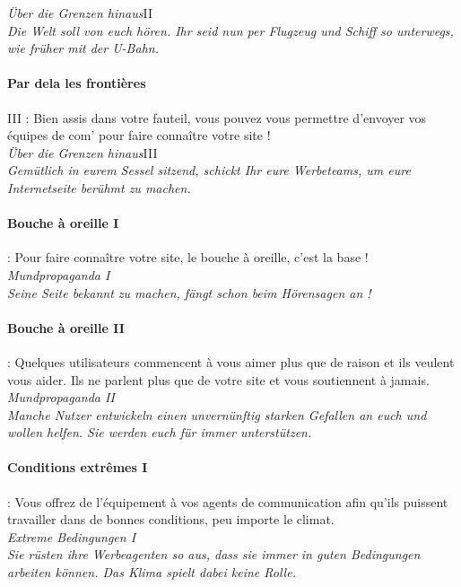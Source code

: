 \documentclass[10pt,a4paper]{article}
\begin{document}
\textit{Über die Grenzen hinaus}II\\
\textit{Die Welt soll von euch hören. Ihr seid nun per Flugzeug und Schiff so unterwegs, wie früher mit der U-Bahn.}


\paragraph{Par dela les frontières} III : Bien assis dans votre fauteil, vous pouvez vous permettre d'envoyer vos équipes de com' pour faire connaître votre site !\\

\textit{Über die Grenzen hinaus}III\\
\textit{Gemütlich in eurem Sessel sitzend, schickt Ihr eure Werbeteams, um eure Internetseite berühmt zu machen.}


\paragraph{Bouche à oreille I} : Pour faire connaître votre site, le bouche à oreille, c'est la base !\\

\textit{Mundpropaganda I}\\
\textit{Seine Seite bekannt zu machen, fängt schon beim Hörensagen an !}


\paragraph{Bouche à oreille II} : Quelques utilisateurs commencent à vous aimer plus que de raison et ils veulent vous aider. Ils ne parlent plus que de votre site et vous soutiennent à jamais.\\

\textit{Mundpropaganda II}\\
\textit{Manche Nutzer entwickeln einen unvernünftig starken Gefallen an euch und wollen helfen. Sie werden euch für immer unterstützen.}


\paragraph{Conditions extrêmes I} : Vous offrez de l'équipement à vos agents de communication afin qu'ils puissent travailler dans de bonnes conditions, peu importe le climat.\\

\textit{Extreme Bedingungen I}\\
\textit{Sie rüsten ihre Werbeagenten so aus, dass sie immer in guten Bedingungen arbeiten können. Das Klima spielt dabei keine Rolle.}
\end{document}
